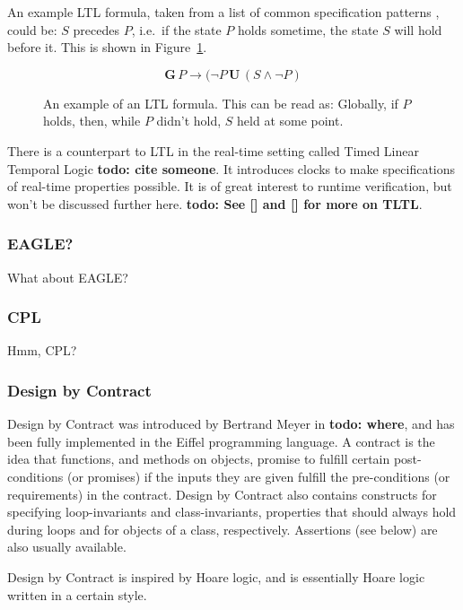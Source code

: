 \documentclass[a4paper,11pt]{kth-mag}
\newcommand{\todo}[1]{\textbf{todo: #1}}
\begin{document}
An example LTL formula, taken from a list of common specification patterns
\cite{dwyer99patterns}, could be: $S$ precedes $P$, i.e.\, if the state $P$ holds
sometime, the state $S$ will hold before it. This is shown in
Figure~\ref{figure-ltl}.

\begin{figure}[h!]

\[
\boldsymbol{G} \, P \rightarrow (\neg P \, \boldsymbol{U} \, (S \wedge \neg P)
\]

\caption{An example of an LTL formula. This can be read as: Globally, if $P$
holds, then, while $P$ didn't hold, $S$ held at some point.}
\label{figure-ltl}
\end{figure}

There is a counterpart to LTL in the real-time setting called Timed Linear
Temporal Logic \todo{cite someone}. It introduces clocks to make specifications
of real-time properties possible. It is of great interest to runtime
verification, but won't be discussed further here. \todo{See [] and [] for more
on TLTL}.

\subsubsection{EAGLE?}

What about EAGLE?

\subsubsection{CPL}

Hmm, CPL?


\subsubsection{Design by Contract}

Design by Contract was introduced by Bertrand Meyer in \todo{where}, and has
been fully implemented in the Eiffel programming language. A contract is the
idea that functions, and methods on objects, promise to fulfill certain
post-conditions (or promises) if the inputs they are given fulfill the
pre-conditions (or requirements) in the contract. Design by Contract also
contains constructs for specifying loop-invariants and class-invariants,
properties that should always hold during loops and for objects of a class,
respectively. Assertions (see below) are also usually available.

Design by Contract is inspired by Hoare logic, and is essentially Hoare logic
written in a certain style.
\end{document}
